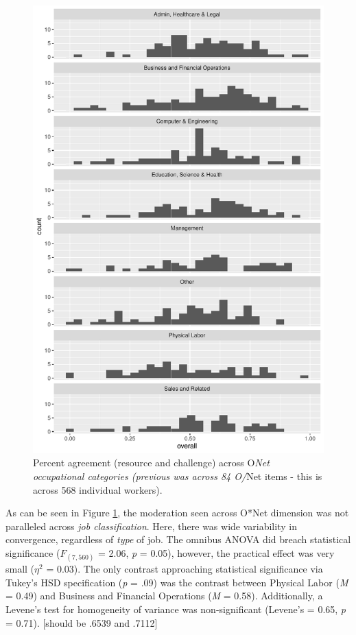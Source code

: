 \documentclass[
  man]{apa6}
\begin{document}
\begin{figure}
\centering
\includegraphics{SIOP2024_agreement_files/figure-latex/workcat-1.pdf}
\caption{\label{fig:workcat}Percent agreement (resource and challenge) across O\emph{Net occupational categories (previous was across 84 O/}Net items - this is across 568 individual workers).}
\end{figure}

As can be seen in Figure \ref{fig:workcat}, the moderation seen across O*Net dimension was not paralleled across \emph{job classification}. Here, there was wide variability in convergence, regardless of \emph{type} of job. The omnibus ANOVA did breach statistical significance (\(F_{(7, 560)}\) = 2.06, \emph{p} = 0.05), however, the practical effect was very small (\(\eta^2\) = 0.03). The only contrast approaching statistical significance via Tukey's HSD specification (\emph{p} = .09) was the contrast between Physical Labor (\emph{M} = 0.49) and Business and Financial Operations (\emph{M} = 0.58). Additionally, a Levene's test for homogeneity of variance was non-significant (Levene's = 0.65, \emph{p} = 0.71). {[}should be .6539 and .7112{]}
\end{document}
